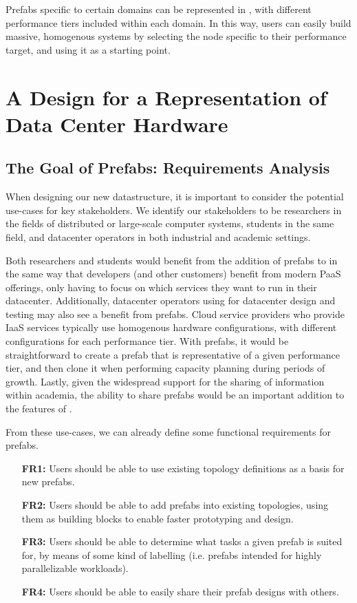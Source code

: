 \documentclass[11pt]{article}
\begin{document}
		Prefabs specific to certain domains can be represented in \opendc{}, with different performance tiers included within each domain.
		In this way, users can easily build massive, homogenous systems by selecting the node specific to their performance target, and using it as a starting point.

\newpage

\section{A Design for a Representation of Data Center Hardware} \label{sec:design}
	
	\subsection{The Goal of Prefabs: Requirements Analysis}
		When designing our new datastructure, it is important to consider the potential use-cases for key stakeholders.
		We identify our stakeholders to be researchers in the fields of distributed or large-scale computer systems, students in the same field, and datacenter operators in both industrial and academic settings.

		Both researchers and students would benefit from the addition of prefabs to \opendc{} in the same way that developers (and other customers) benefit from modern PaaS offerings, only having to focus on which services they want to run in their datacenter.
		Additionally, datacenter operators using \opendc{} for datacenter design and testing may also see a benefit from prefabs. 
		Cloud service providers who provide IaaS services typically use homogenous hardware configurations, with different configurations for each performance tier. 
		With prefabs, it would be straightforward to create a prefab that is representative of a given performance tier, and then clone it when performing capacity planning during periods of growth.
		Lastly, given the widespread support for the sharing of information within academia, the ability to share prefabs would be an important addition to the features of \opendc{}.

		From these use-cases, we can already define some functional requirements for prefabs.
		\begin{itemize}
			\item [\textbf{FR1:}] Users should be able to use existing topology definitions as a basis for new prefabs.
			\item [\textbf{FR2:}] Users should be able to add prefabs into existing topologies, using them as building blocks to enable faster prototyping and design.
			\item [\textbf{FR3:}] Users should be able to determine what tasks a given prefab is suited for, by means of some kind of labelling (i.e. prefabs intended for highly parallelizable workloads).
			\item [\textbf{FR4:}] Users should be able to easily share their prefab designs with others.
		\end{itemize}
\end{document}
